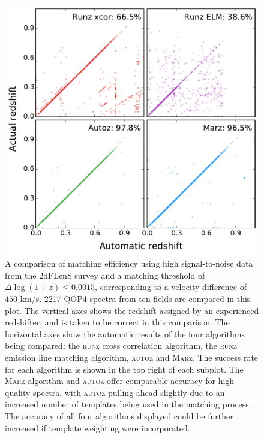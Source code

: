 \documentclass[5p]{elsarticle}
\newcommand{\runz}{\textsc{runz}}
\newcommand{\autoz}{\textsc{autoz}}
\newcommand{\marz}{\textsc{Marz}}
\begin{document}
\begin{figure}[h]
\centering
\includegraphics[width=\columnwidth]{2dfComp.pdf}
\caption{A comparison of matching efficiency using high signal-to-noise data from the 2dFLenS survey and a matching threshold of $\Delta \log(1+z) \leq 0.0015$, corresponding to a velocity difference of  $450$ km/s. 2217 QOP4 spectra from ten fields are compared in this plot. The vertical axes shows the redshift assigned by an experienced redshifter, and is taken to be correct in this comparison. The horizontal axes show the automatic results of the four algorithms being compared: the \runz{} cross correlation algorithm, the \runz{} emission line matching algorithm, \autoz{} and \marz{}. The success rate for each algorithm is shown in the top right of each subplot. The \marz{} algorithm and \autoz{} offer comparable accuracy for high quality spectra, with \autoz{} pulling ahead slightly due to an increased number of templates being used in the matching process. The accuracy of all four algorithms displayed  could be further increased if template weighting were incorporated.}
\label{fig:high}
\end{figure}
\end{document}
